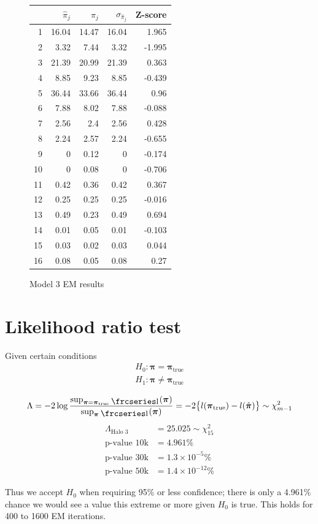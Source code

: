 \documentclass[12pt]{amsart}
\newcommand{\textfrc}[1]{{\frcseries#1}}
\newcommand{\mathfrc}[1]{\raisebox{-0.8mm}{\text{\textfrc{\small #1}}}\hspace{0.4mm}}
\newcommand{\vect}[1]{\boldsymbol{\mathbf{#1}}}
\newcommand{\eqn}[1]{\begin{align*}
#1
\end{align*}}
\newcommand{\bl}{\big\{}
\newcommand{\br}{\big\}}
\newcommand{\vp}{\vect{\pi}}
\newcommand{\vph}{\hat{\vect{\pi}}}
\newcommand{\llp}{\mathfrc{l}(\vect{\pi})}
\begin{document}
\begin{figure}
\caption{Model 3 EM results}
\begin{tabular}{r| r| r| r| r|}
		& $\hat{\pi}_j$ & $\pi_j$ & $\sigma_{\hat{\pi}_j}$ & Z-score	\\
		\hline
1	& 16.04   &     14.47   &     16.04    &    1.965      \\
2	&  3.32   &      7.44   &      3.32    &   -1.995      \\
3	& 21.39   &     20.99   &     21.39    &    0.363      \\
4	&  8.85   &      9.23   &      8.85    &   -0.439      \\
5	& 36.44   &     33.66   &     36.44    &     0.96      \\
6	&  7.88   &      8.02   &      7.88    &   -0.088      \\
7	&  2.56   &       2.4   &      2.56    &    0.428      \\
8	&  2.24   &      2.57   &      2.24    &   -0.655      \\
9	&     0   &      0.12   &         0    &   -0.174      \\
10	&     0   &      0.08   &         0    &   -0.706      \\
11	&  0.42   &      0.36   &      0.42    &    0.367      \\
12	&  0.25   &      0.25   &      0.25    &   -0.016      \\
13	&  0.49   &      0.23   &      0.49    &    0.694      \\
14	&  0.01   &      0.05   &      0.01    &   -0.103      \\
15	&  0.03   &      0.02   &      0.03    &    0.044      \\
16	&  0.08   &      0.05   &      0.08    &     0.27      \\   		\end{tabular}
\end{figure}





               
               

\clearpage
\section{Likelihood ratio test}
Given certain conditions
\eqn{
	H_0: \vp = \vp_\text{true}	\\
	H_1: \vp \neq \vp_\text{true}
}

\eqn{
	\Lambda = -2 \log \frac{ \sup_{\vp=\vp_\text{true}} \llp}{ \sup_{\vp} \llp }  = -2\bl l(\vp_\text{true}) - l(\vph) \br \sim \chi^2_{m-1}	\\
}
\eqn{
	\Lambda_\text{Halo 3} &= 25.025 \sim \chi^2_{15}	\\
	\text{p-value 10k} &= 4.961\%\\
	\text{p-value 30k} &= 1.3\times 10^{-5}\%\\
	\text{p-value 50k} &= 1.4\times 10^{-12}\%
}

Thus we accept $H_0$ when requiring 95\% or less confidence; there is only a 4.961\% chance we would see a value this extreme or more given $H_0$ is true. This holds for 400 to 1600 EM iterations.
\end{document}
